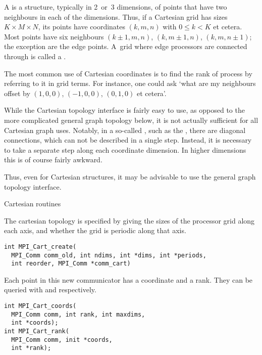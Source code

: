 A  is a structure, typically in 2~or~3 dimensions,
of points that have two neighbours in each of the dimensions.
Thus, if a Cartesian grid has sizes $K\times M\times N$, its
points have coordinates $(k,m,n)$ with $0\leq k<K$ et cetera.
Most points have six neighbours $(k\pm1,m,n)$, $(k,m\pm1,n)$, $(k,m,n\pm1)$;
the exception are the edge points. A~grid where edge processors
are connected through  is called
a .

The most common use of Cartesian coordinates
is to find the rank of process by referring to it in grid terms.
For instance, one could ask `what are my neighbours offset by $(1,0,0)$, 
$(-1,0,0)$, $(0,1,0)$ et cetera'.

While the Cartesian topology interface is fairly easy to use, as
opposed to the more complicated general graph topology below, it is
not actually sufficient for all Cartesian graph uses. Notably, in
a so-called , such as the
, there are diagonal connections,
which can not be described in a single step. Instead, it is necessary
to take a separate step along each coordinate dimension. In higher
dimensions this is of course fairly awkward.

Thus, even for Cartesian structures, it may be advisable to use the
general graph topology interface.

 {Cartesian routines}

The cartesian topology is specified by giving
 the sizes of the processor grid along
each axis, and whether the grid is periodic along that axis.

\lstset{style=reviewcode,language=C}
\begin{lstlisting}
int MPI_Cart_create(
  MPI_Comm comm_old, int ndims, int *dims, int *periods, 
  int reorder, MPI_Comm *comm_cart)
\end{lstlisting}

Each point in this new communicator has a coordinate and a rank.  They
can be queried with  and
 respectively.

\lstset{style=reviewcode,language=C}
\begin{lstlisting}
int MPI_Cart_coords(
  MPI_Comm comm, int rank, int maxdims,
  int *coords);
int MPI_Cart_rank(
  MPI_Comm comm, init *coords, 
  int *rank);
\end{lstlisting}

